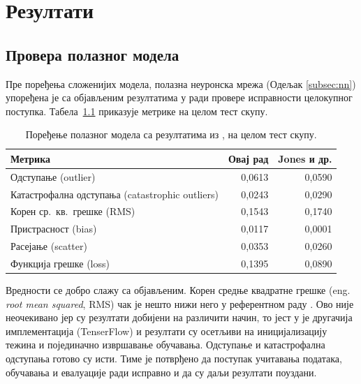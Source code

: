 \documentclass[12pt,oneside]{memoir}
\begin{document}
\chapter{Резултати}

\section{Провера полазног модела}
\label{sec:baseline}

Пре поређења сложенијих модела, полазна неуронска мрежа (Одељак \ref{subsec:nn}) упоређена је са
објављеним резултатима у \cite{jones2024a} ради провере исправности
целокупног поступка. Табела~\ref{tab:baseline-jones} приказује метрике на
целом тест скупу.

\begin{table}[htbp]
\centering
\caption{Поређење полазног модела са резултатима из \cite{jones2024a}, на целом тест скупу.}
\label{tab:baseline-jones}
\begin{tabular}{lrr}
\toprule
Метрика & Овај рад & Jones и др. \\
\midrule
Одступање (outlier)                                     & 0,0613 & 0,0590 \\
Катастрофална одступања (catastrophic outliers)         & 0,0243 & 0,0290 \\
Корен ср.\ кв.\ грешке (RMS)                            & 0,1543 & 0,1740 \\
Пристрасност (bias)                                     & 0,0117 & 0,0001 \\
Расејање (scatter)                                      & 0,0353 & 0,0260 \\
Функција грешке (loss)                                  & 0,1395 & 0,0890 \\
\bottomrule
\end{tabular}
\end{table}

Вредности се добро слажу са објављеним. Корен средње квадратне грешке (eng. \textit{root mean squared}, RMS) чак је
нешто нижи него у референтном раду \cite{jones2024a}. Ово није неочекивано јер су резултати
добијени на различити начин, то јест у \cite{jones2024a} је другачија имплементација (TenserFlow) 
и резултати су осетљиви на иницијализацију тежина и појединачно извршавање обучавања.
Одступање и катастрофална одступања готово су исти. Тиме је потврђено да поступак
учитавања података, обучавања и евалуације ради исправно и да су даљи
резултати поуздани.
\end{document}
